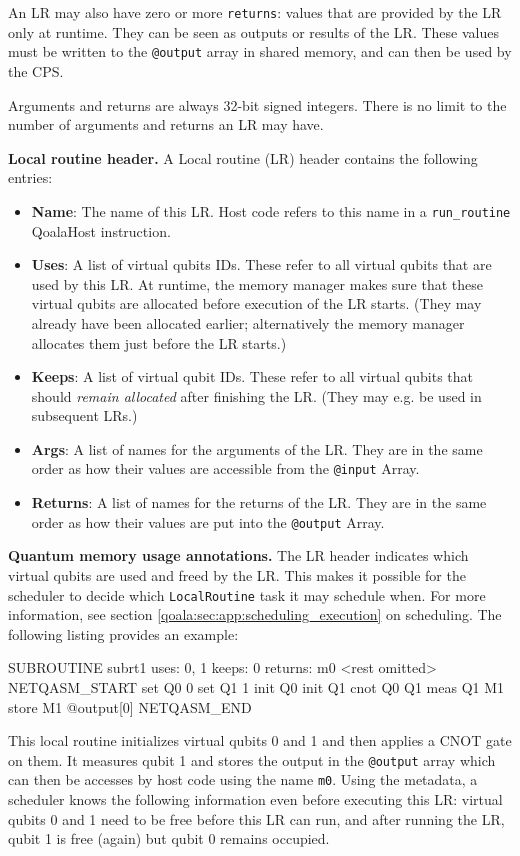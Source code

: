 An LR may also have zero or more \texttt{returns}: values that are provided by the LR only at runtime.
They can be seen as outputs or results of the LR.
These values must be written to the \texttt{@output} array in shared memory, and can then be used by the CPS.

Arguments and returns are always 32-bit signed integers. There is no limit to the number of arguments and returns an LR may have.

\textbf{Local routine header.}
A Local routine (LR) header contains the following entries:
\begin{itemize}
\item \textbf{Name}: The name of this LR. Host code refers to this name in a \texttt{run\_routine} QoalaHost instruction.
\item \textbf{Uses}: A list of virtual qubits IDs. These refer to all virtual qubits that are used by this LR. At runtime, the memory manager makes sure that these virtual qubits are allocated before execution of the LR starts. (They may already have been allocated earlier; alternatively the memory manager allocates them just before the LR starts.)
\item \textbf{Keeps}: A list of virtual qubit IDs. These refer to all virtual qubits that should \textit{remain allocated} after finishing the LR. (They may e.g. be used in subsequent LRs.)
\item \textbf{Args}: A list of names for the arguments of the LR. They are in the same order as how their values are accessible from the \texttt{@input} Array.
\item \textbf{Returns}: A list of names for the returns of the LR. They are in the same order as how their values are put into the \texttt{@output} Array.
\end{itemize}

\textbf{Quantum memory usage annotations.}
The LR header indicates which virtual qubits are used and freed by the LR. This makes it possible for the scheduler to decide which \texttt{LocalRoutine} task it may schedule when. For more information, see section \cref{qoala:sec:app:scheduling_execution} on scheduling.
The following listing provides an example:

\begin{qoalacode}
SUBROUTINE subrt1
    uses: 0, 1
    keeps: 0
    returns: m0
    <rest omitted>
  NETQASM_START
    set Q0 0
    set Q1 1
    init Q0
    init Q1
    cnot Q0 Q1
    meas Q1 M1
    store M1 @output[0]
  NETQASM_END
\end{qoalacode}
This local routine initializes virtual qubits 0 and 1 and then applies a CNOT gate on them.
It measures qubit 1 and stores the output in the \texttt{@output} array which can then be accesses by host code using the name \texttt{m0}.
Using the metadata, a scheduler knows the following information even before executing this LR: virtual qubits 0 and 1 need to be free before this LR can run, and after running the LR, qubit 1 is free (again) but qubit 0 remains occupied.

